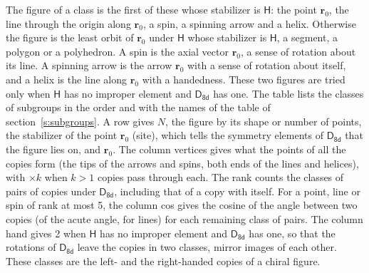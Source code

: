 \documentclass[10pt,a4paper]{article}
\numberwithin{equation}{section}
\newcommand{\grp}[1]{\mathsf{#1}}
\newcommand{\pointr}{\mathbf{r}}
\begin{document}
\leavevmode\label{n:head.figure}The figure of a class is the first of these whose stabilizer is $\grp{H}$: the point $\pointr_0$, the line through the origin along $\pointr_0$, a spin, a spinning arrow and a helix. Otherwise the figure is the least orbit of $\pointr_0$ under $\grp{H}$ whose stabilizer is $\grp{H}$, a segment, a polygon or a polyhedron. A spin is the axial vector $\pointr_0$, a sense of rotation about its line. A spinning arrow is the arrow $\pointr_0$ with a sense of rotation about itself, and a helix is the line along $\pointr_0$ with a handedness. These two figures are tried only when $\grp{H}$ has no improper element and $\grp{D_{8d}}$ has one. The table lists the classes of subgroups in the order and with the names of the table of section~\ref{s:subgroups}. \label{n:head.site}A row gives $N$, the figure by its shape or number of points, the stabilizer of the point $\pointr_0$ (site), which tells the symmetry elements of $\grp{D_{8d}}$ that the figure lies on, and $\pointr_0$. \label{n:head.vertices}The column vertices gives what the points of all the copies form (the tips of the arrows and spins, both ends of the lines and helices), with ${\times}k$ when $k > 1$ copies pass through each. \label{n:head.rank}The rank counts the classes of pairs of copies under $\grp{D_{8d}}$, including that of a copy with itself. \label{n:head.cos}For a point, line or spin of rank at most 5, the column cos gives the cosine of the angle between two copies (of the acute angle, for lines) for each remaining class of pairs. \label{n:head.hand}The column hand gives 2 when $\grp{H}$ has no improper element and $\grp{D_{8d}}$ has one, so that the rotations of $\grp{D_{8d}}$ leave the copies in two classes, mirror images of each other. These classes are the left- and the right-handed copies of a chiral figure.
\end{document}
